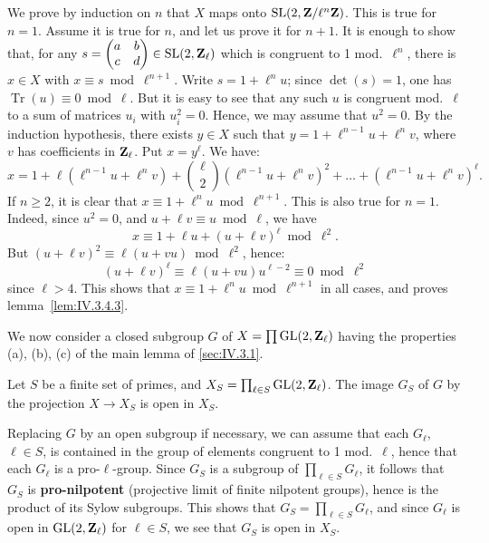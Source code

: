 We prove by induction on $n$ that $X$ maps onto $\mathrm{SL}(2,\mathbf{Z}/\ell^n\mathbf{Z})$. This is true for $n=1$. Assume it is true for $n$, and let us prove it for $n+1$. It is enough to show that, for any $s = \begin{pmatrix} a & b \\ c & d \end{pmatrix} \in \mathrm{SL}(2,\mathbf{Z}_\ell)$ which is congruent to 1 mod.\ $\ell^n$, there is $x \in X$ with $x \equiv s \bmod \ell^{n+1}$. Write $s = 1 + \ell^n u$; since $\det(s)=1$, one has $\operatorname{Tr}(u) \equiv 0 \bmod \ell$. But it is easy to see that any such $u$ is congruent mod.\ $\ell$ to a sum of matrices $u_i$ with $u_i^2=0$. Hence, we may assume that $u^2=0$. By the induction hypothesis, there exists $y \in X$ such that $y = 1 + \ell^{n-1}u + \ell^n v$, where $v$ has coefficients in $\mathbf{Z}_\ell$. Put $x = y^{\ell}$. We have:
\[
  x = 1 + \ell(\ell^{n-1}u + \ell^n v) + \binom{\ell}{2}(\ell^{n-1}u + \ell^n v)^2 + \dots + (\ell^{n-1}u + \ell^n v)^{\ell}.
\]
If $n \geq 2$, it is clear that $x \equiv 1 + \ell^n u \bmod \ell^{n+1}$. This is also true for $n=1$. Indeed, since $u^2=0$, and $u + \ell v \equiv u \bmod \ell$, we have
\[
  x \equiv 1 + \ell u + (u + \ell v)^{\ell} \bmod \ell^2.
\]
But $(u + \ell v)^2 \equiv \ell(u + vu) \bmod \ell^2$, hence:
\[
  (u + \ell v)^{\ell} \equiv \ell(u + vu)u^{\ell-2} \equiv 0 \bmod \ell^2
\]
since $\ell > 4$. This shows that $x \equiv 1 + \ell^n u \bmod \ell^{n+1}$ in all cases, and proves lemma~\ref{lem:IV.3.4.3}.

We now consider a closed subgroup $G$ of $X = \prod \mathrm{GL}(2,\mathbf{Z}_\ell)$ having the properties (a), (b), (c) of the main lemma of \ref{sec:IV.3.1}.

\begin{lemma}[4]\label{lem:IV.3.4.4}
Let $S$ be a finite set of primes, and $X_S = \prod_{\ell \in S} \mathrm{GL}(2,\mathbf{Z}_\ell)$. The image $G_S$ of $G$ by the projection $X \longrightarrow X_S$ is open in $X_S$.
\end{lemma}

Replacing $G$ by an open subgroup if necessary, we can assume that each $G_\ell$, $\ell \in S$, is contained in the group of elements congruent to 1 mod.\ $\ell$, hence that each $G_\ell$ is a pro-$\ell$-group. Since $G_S$ is a subgroup of $\prod_{\ell \in S} G_\ell$, it follows that $G_S$ is \textbf{pro-nilpotent} (projective limit of finite nilpotent groups), hence is the product of its Sylow subgroups. This shows that $G_S = \prod_{\ell \in S} G_\ell$, and since $G_\ell$ is open in $\mathrm{GL}(2,\mathbf{Z}_\ell)$ for $\ell \in S$, we see that $G_S$ is open in $X_S$.

